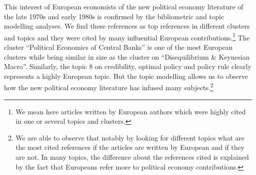 \documentclass[]{elsarticle} %
\begin{document}
This interest of European economists of the new political economy
literature of the late 1970s and early 1980s is confirmed by the
bibliometric and topic modelling analyses. We find these references as
top references in different clusters and topics and they were cited by
many influential European contributions.\footnote{We mean here articles
  written by European authors which were highly cited in one or several
  topics and clusters.} The cluster ``Political Economics of Central
Banks'' is one of the most European clusters while being similar in size
as the cluster on ``Disequilibrium \& Keynesian Macro''. Similarly, the
topic 8 on credibility, optimal policy and policy rule clearly
represents a highly European topic. But the topic modelling allows us to
observe how the new political economy literature has infused many
subjects.\footnote{We are able to observe that notably by looking for
  different topics what are the most cited references if the articles
  are written by European and if they are not. In many topics, the
  difference about the references cited is explained by the fact that
  Europeans refer more to political economy contributions.}
\end{document}
